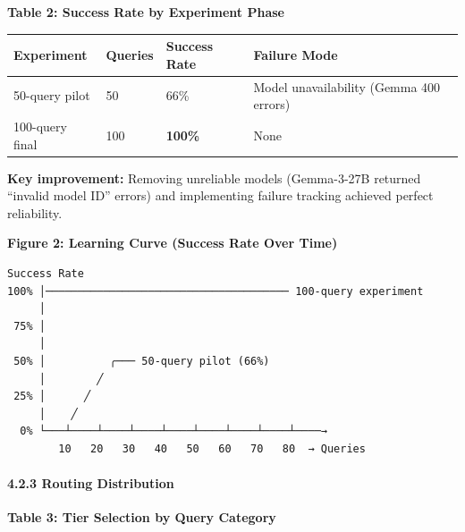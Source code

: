 \documentclass[
]{article}
\begin{document}
\textbf{Table 2: Success Rate by Experiment Phase}

\begin{longtable}[]{@{}llll@{}}
\toprule
Experiment & Queries & Success Rate & Failure Mode \\
\midrule
\endhead
50-query pilot & 50 & 66\% & Model unavailability (Gemma 400 errors) \\
100-query final & 100 & \textbf{100\%} & None \\
\bottomrule
\end{longtable}

\textbf{Key improvement:} Removing unreliable models (Gemma-3-27B
returned ``invalid model ID'' errors) and implementing failure tracking
achieved perfect reliability.

\textbf{Figure 2: Learning Curve (Success Rate Over Time)}

\begin{verbatim}
Success Rate
100% │────────────────────────────────────── 100-query experiment
     │
 75% │
     │
 50% │          ╭─── 50-query pilot (66%)
     │        ╱
 25% │      ╱
     │    ╱
  0% └───┴────┴────┴────┴────┴────┴────┴────┴────→
        10   20   30   40   50   60   70   80  → Queries
\end{verbatim}

\hypertarget{routing-distribution-1}{%
\paragraph{4.2.3 Routing Distribution}\label{routing-distribution-1}}

\textbf{Table 3: Tier Selection by Query Category}
\end{document}
